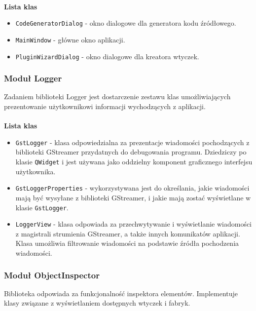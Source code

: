\documentclass[12pt]{article}
\begin{document}
\paragraph{}
\textbf{Lista klas}
\vspace{-2mm}
\begin{itemize}
  \setlength{\itemsep}{0em}
\item \texttt{CodeGeneratorDialog} - okno dialogowe dla generatora kodu źródłowego.
\item \texttt{MainWindow} - główne okno aplikacji.
\item \texttt{PluginWizardDialog} - okno dialogowe dla kreatora wtyczek.
\end{itemize}
\subsubsection{Moduł Logger}
Zadaniem biblioteki Logger jest dostarczenie zestawu klas umożliwiających prezentowanie użytkownikowi informacji wychodzących z aplikacji. 
\paragraph{}
\textbf{Lista klas}
\vspace{-2mm}
\begin{itemize}
  \setlength{\itemsep}{0em}
\item \texttt{GstLogger} - klasa odpowiedzialna za prezentacje wiadomości pochodzących z biblioteki GStreamer przydatnych do debugowania programu. Dziedziczy po klasie \texttt{QWidget} i jest używana jako oddzielny komponent graficznego interfejsu użytkownika.
\item \texttt{GstLoggerProperties} - wykorzystywana jest do określania, jakie wiadomości mają być wysyłane z biblioteki GStreamer, i jakie mają zostać wyświetlane w klasie \texttt{GstLogger}.
\item \texttt{LoggerView} - klasa odpowiada za przechwytywanie i wyświetlanie wiadomości z magistrali strumienia GStreamer, a także innych komunikatów aplikacji. Klasa umożliwia filtrowanie wiadomości na podstawie źródła pochodzenia wiadomości.
\end{itemize}
\subsubsection{Moduł ObjectInspector}
Biblioteka odpowiada za funkcjonalność inspektora elementów. Implementuje klasy związane z wyświetlaniem dostępnych wtyczek i fabryk.
\end{document}
